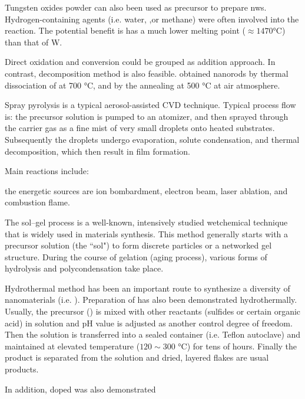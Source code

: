 Tungsten oxides powder can also been used as precursor to prepare  \glspl{nw}.\cite{Huang2008a,Wang2009} Hydrogen-containing agents (i.e. water, ,or methane\cite{Klinke2005}) were often involved into the reaction.\cite{Baek2007,Karuppanan2007} The potential benefit is  has a much lower melting point ($\approx 1470$\si{\degreeCelsius}) than that of W.

Direct oxidation and  conversion could be grouped as addition approach. In contrast, decomposition method is also feasible.
\citeauthor{Pol2005} obtained  nanorods by thermal dissociation of  at 700 \si{\degreeCelsius}, and  by the annealing at 500 \si{\degreeCelsius} at air atmosphere.\cite{Pol2005}

Spray pyrolysis is a typical aerosol-assisted CVD technique. Typical process flow is: the precursor solution is pumped to an atomizer, and then sprayed through the carrier gas as a fine mist of very small droplets onto heated substrates. Subsequently the droplets undergo evaporation, solute condensation, and thermal decomposition, which then result in film formation.\cite{Zheng2011}

Main reactions include:  

the energetic sources are ion bombardment, electron beam, laser ablation, and combustion flame\cite{Rao2011}.

The sol–gel process is a well-known, intensively studied wetchemical technique that is widely used in materials synthesis. This method generally starts with a precursor solution (the ``sol") to form discrete particles or a networked gel structure. During the course of gelation (aging process), various forms of hydrolysis and polycondensation take place.

Hydrothermal method has been an important route to synthesize a diversity of nanomaterials (i.e. ). Preparation of  has also been demonstrated hydrothermally.\cite{Lee2003,Gu2007} Usually, the precursor () is mixed with other reactants (sulfides or certain organic acid) in solution and pH value is adjusted as another control degree of freedom. Then the solution is transferred into a sealed container (i.e. Teflon autoclave) and maintained at elevated temperature ($120 \sim 300$ \si{\degreeCelsius}) for tens of hours. Finally the product is separated from the solution and dried, layered  flakes are usual products.

In addition, doped  was also demonstrated

